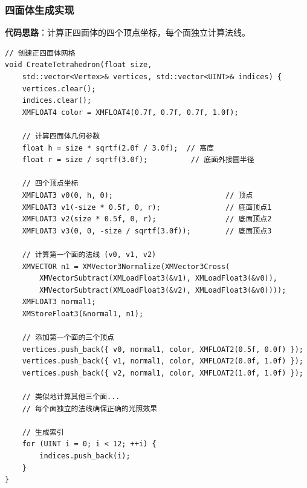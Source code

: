 \documentclass[12pt,a4paper]{article}
\begin{document}
\begin{tcolorbox}
\subsubsection{四面体生成实现}

\textbf{代码思路}：计算正四面体的四个顶点坐标，每个面独立计算法线。

\begin{lstlisting}[caption={四面体生成函数}]
// 创建正四面体网格
void CreateTetrahedron(float size, 
    std::vector<Vertex>& vertices, std::vector<UINT>& indices) {
    vertices.clear();
    indices.clear();
    XMFLOAT4 color = XMFLOAT4(0.7f, 0.7f, 0.7f, 1.0f);
    
    // 计算四面体几何参数
    float h = size * sqrtf(2.0f / 3.0f);  // 高度
    float r = size / sqrtf(3.0f);          // 底面外接圆半径
    
    // 四个顶点坐标
    XMFLOAT3 v0(0, h, 0);                          // 顶点
    XMFLOAT3 v1(-size * 0.5f, 0, r);               // 底面顶点1
    XMFLOAT3 v2(size * 0.5f, 0, r);                // 底面顶点2
    XMFLOAT3 v3(0, 0, -size / sqrtf(3.0f));        // 底面顶点3
    
    // 计算第一个面的法线 (v0, v1, v2)
    XMVECTOR n1 = XMVector3Normalize(XMVector3Cross(
        XMVectorSubtract(XMLoadFloat3(&v1), XMLoadFloat3(&v0)),
        XMVectorSubtract(XMLoadFloat3(&v2), XMLoadFloat3(&v0))));
    XMFLOAT3 normal1;
    XMStoreFloat3(&normal1, n1);
    
    // 添加第一个面的三个顶点
    vertices.push_back({ v0, normal1, color, XMFLOAT2(0.5f, 0.0f) });
    vertices.push_back({ v1, normal1, color, XMFLOAT2(0.0f, 1.0f) });
    vertices.push_back({ v2, normal1, color, XMFLOAT2(1.0f, 1.0f) });
    
    // 类似地计算其他三个面...
    // 每个面独立的法线确保正确的光照效果
    
    // 生成索引
    for (UINT i = 0; i < 12; ++i) {
        indices.push_back(i);
    }
}
\end{lstlisting}
\end{tcolorbox}
\end{document}

